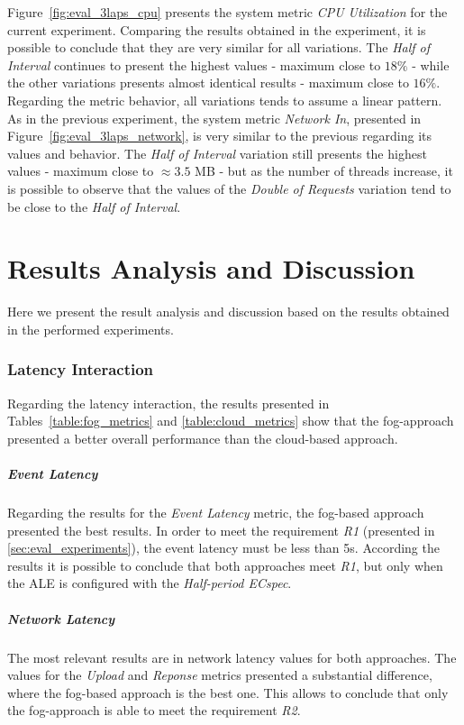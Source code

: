 Figure~\ref{fig:eval_3laps_cpu} presents the system metric \textit{CPU Utilization} for the current
experiment. Comparing the results obtained in the experiment, it is possible to conclude that
they are very similar for all variations. The \textit{Half of Interval} continues to present
the highest values - maximum close to $18\%$ - while the other variations presents almost identical
results - maximum close to $16\%$. Regarding the metric behavior, all variations tends to assume
a linear pattern.\\

As in the previous experiment, the system metric \textit{Network In}, presented in Figure~\ref{fig:eval_3laps_network},
is very similar to the previous regarding its values and behavior. The \textit{Half of Interval}
variation still presents the highest values - maximum close to $\approx3.5$ \gls{MB} - but as the number of
threads increase, it is possible to observe that the values of the \textit{Double of Requests}
variation tend to be close to the \textit{Half of Interval}.

\section{Results Analysis and Discussion}
\label{sec:eval_analysis}
Here we present the result analysis and discussion based on the results obtained in the performed
experiments.

\subsubsection{Latency Interaction}
\label{subs:eval_results_latency}
Regarding the latency interaction, the results presented in Tables~\ref{table:fog_metrics} and
\ref{table:cloud_metrics} show that the fog-approach presented a better overall performance than
the cloud-based approach.

\subparagraph{Event Latency}
\label{subp:eval_event_latency}
Regarding the results for the \textit{Event Latency} metric, the fog-based approach presented the
best results. In order to meet the requirement \textit{R1} (presented in \ref{sec:eval_experiments}),
the event latency must be less than 5s. According the results it is possible to conclude that both
approaches meet \textit{R1}, but only when the \gls{ALE} is configured with the \textit{Half-period ECspec}.

\subparagraph{Network Latency}
\label{subp:eval_network_latency}
The most relevant results are in network latency values for both approaches. The values for the \textit{Upload}
and \textit{Reponse} metrics presented a substantial difference, where the fog-based approach is the
best one. This allows to conclude that only the fog-approach is able to meet the requirement \textit{R2}.\\

